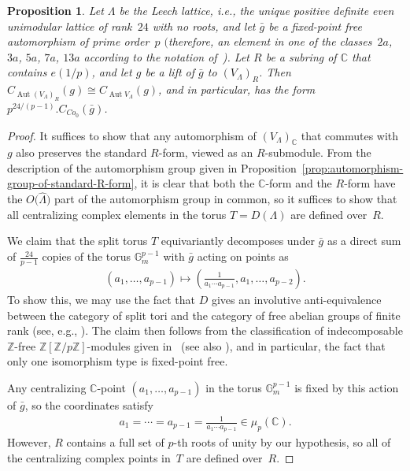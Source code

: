 \documentclass[11pt]{article}
\newcommand{\bC}{\mathbb{C}}
\newcommand{\bG}{\mathbb{G}}
\newcommand{\bZ}{\mathbb{Z}}
\DeclareMathOperator{\Aut}{Aut}
\newtheorem{prop}[thm]{Proposition}
\theoremstyle{definition}
\begin{document}
\begin{prop} \label{prop:centralizers-for-Leech}
Let $\Lambda$ be the Leech lattice, i.e., the unique positive definite even uni\-mo\-dular lattice of rank~$24$ with no roots, and let $\bar{g}$ be a fixed-point free automorphism of prime order~$p$ $($therefore, an element in one of the classes~$2a$, $3a$, $5a$, $7a$, $13a$ according to the notation of~{\rm \cite{GAP})}. Let $R$ be a subring of $\bC$ that contains $e(1/p)$, and let $g$ be a lift of $\bar{g}$ to $(V_\Lambda)_R$. Then $C_{\Aut (V_\Lambda)_R}(g) \cong C_{\Aut V_\Lambda}(g)$, and in particular, has the form $p^{24/(p-1)}.C_{Co_0}(\bar{g})$.
\end{prop}
\begin{proof}It suffices to show that any automorphism of $(V_\Lambda)_\bC$ that commutes with $g$ also preserves the standard $R$-form, viewed as an $R$-submodule. From the description of the automorphism group given in Proposition~\ref{prop:automorphism-group-of-standard-R-form}, it is clear that both the $\bC$-form and the $R$-form have the $O\big(\hat{\Lambda}\big)$ part of the automorphism group in common, so it suffices to show that all centralizing complex elements in the torus $T = D(\Lambda)$ are defined over~$R$.

We claim that the split torus $T$ equivariantly decomposes under $\bar{g}$ as a direct sum of $\frac{24}{p-1}$ copies of the torus $\bG_m^{p-1}$ with $\bar{g}$ acting on points as
\begin{gather*} (a_1, \ldots ,a_{p-1}) \mapsto \left(\frac{1}{a_1\cdots a_{p-1}},a_1,\ldots,a_{p-2}\right). \end{gather*}
To show this, we may use the fact that $D$ gives an involutive anti-equivalence between the category of split tori and the category of free abelian groups of finite rank (see, e.g., \cite[Expos\'e~VIII, Section~1]{SGA3}). The claim then follows from the classification of indecomposable $\bZ$-free $\bZ[\bZ/p\bZ]$-modules given in~\cite{D38} (see also \cite[Theorem~74.3]{CR62}), and in particular, the fact that only one isomorphism type is fixed-point free.

Any centralizing $\bC$-point $(a_1, \ldots, a_{p-1})$ in the torus $\bG_m^{p-1}$ is fixed by this action of $\bar{g}$, so the coordinates satisfy
\begin{gather*} a_1=\cdots = a_{p-1} = \frac{1}{a_1\cdots a_{p-1}} \in \mu_p(\bC). \end{gather*}
However, $R$ contains a full set of $p$-th roots of unity by our hypothesis, so all of the centralizing complex points in~$T$ are defined over~$R$.
\end{proof}
\end{document}
